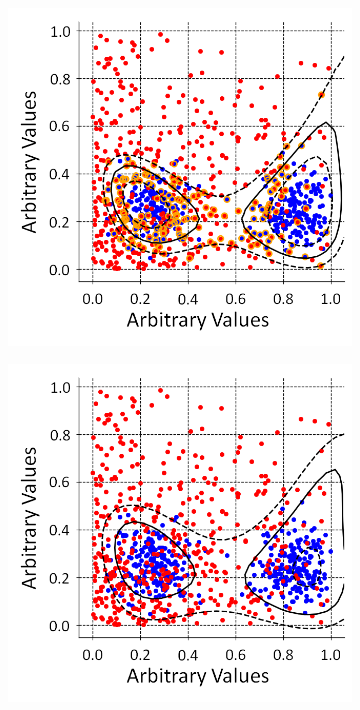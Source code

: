 \begin{figure}[!h]
\centering
\begin{subfigure}{.5\textwidth}
  \centering
  \includegraphics[width=\linewidth]{Chapter4/Figs/adjustedSvmPlots/adjusted_exp_2GaussExample.png}
  \captionsetup{width=.9\linewidth}
  \caption{}
  \label{subFig:svmExp_2GausseExample}
\end{subfigure}%
\begin{subfigure}{.5\textwidth}
  \centering
  \includegraphics[width=\linewidth]{Chapter4/Figs/adjustedSvmPlots/adjusted_exp_2NysGaussExample.png}

\end{subfigure}
\end{figure}
